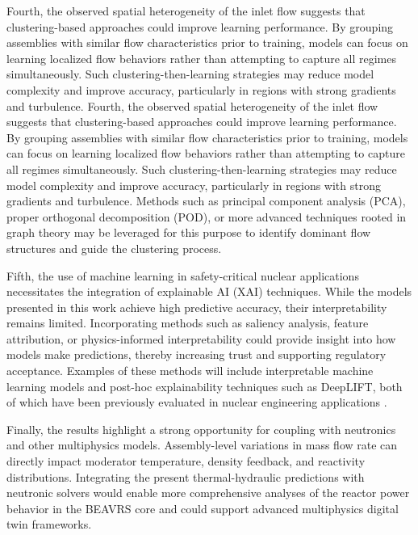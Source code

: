 \documentclass[review]{elsarticle}
\theoremstyle{definition}
\theoremstyle{definition}
\theoremstyle{remark}
\begin{document}
Fourth, the observed spatial heterogeneity of the inlet flow suggests that clustering-based approaches could improve learning performance. By grouping assemblies with similar flow characteristics prior to training, models can focus on learning localized flow behaviors rather than attempting to capture all regimes simultaneously. Such clustering-then-learning strategies may reduce model complexity and improve accuracy, particularly in regions with strong gradients and turbulence. Fourth, the observed spatial heterogeneity of the inlet flow suggests that clustering-based approaches could improve learning performance. By grouping assemblies with similar flow characteristics prior to training, models can focus on learning localized flow behaviors rather than attempting to capture all regimes simultaneously. Such clustering-then-learning strategies may reduce model complexity and improve accuracy, particularly in regions with strong gradients and turbulence. Methods such as principal component analysis (PCA), proper orthogonal decomposition (POD), or more advanced techniques rooted in graph theory may be leveraged for this purpose to identify dominant flow structures and guide the clustering process.

Fifth, the use of machine learning in safety-critical nuclear applications necessitates the integration of explainable AI (XAI) techniques. While the models presented in this work achieve high predictive accuracy, their interpretability remains limited. Incorporating methods such as saliency analysis, feature attribution, or physics-informed interpretability could provide insight into how models make predictions, thereby increasing trust and supporting regulatory acceptance. Examples of these methods will include interpretable machine learning models and post-hoc explainability techniques such as DeepLIFT, both of which have been previously evaluated in nuclear engineering applications \cite{myers2025pymaise,panczyk2025opening}.

Finally, the results highlight a strong opportunity for coupling with neutronics and other multiphysics models. Assembly-level variations in mass flow rate can directly impact moderator temperature, density feedback, and reactivity distributions. Integrating the present thermal-hydraulic predictions with neutronic solvers would enable more comprehensive analyses of the reactor power behavior in the BEAVRS core and could support advanced multiphysics digital twin frameworks.
\end{document}
